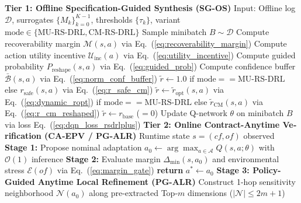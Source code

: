 \documentclass[oneside,openany,phd]{TMU-Thesis}
\begin{document}
\begin{algorithm}[H]
\caption{معماری دوسطحی \rsdrlplus (سنتز غیربرخط سیاست و تصمیم‌گیری مقید به بودجه زمانی)}
\label{alg:rsdrlplus_full}
\begin{latin}
\scriptsize
\begin{algorithmic}[1]
\STATE \textbf{Tier 1: Offline Specification-Guided Synthesis (SG-OS)}
\STATE Input: Offline log $\mathcal{D}$, surrogates $\{M_k\}_{k=0}^{K-1}$, thresholds $\{\tau_k\}$, variant $\text{mode} \in \{\text{MU-RS-DRL}, \text{CM-RS-DRL}\}$
  \STATE Sample minibatch $B \sim \mathcal{D}$
    \STATE Compute recoverability margin $\mathcal{M}(s, a)$ via Eq.~(\ref{eq:recoverability_margin})
    \STATE Compute action utility incentive $\mathcal{U}_{\text{inc}}(a)$ via Eq.~(\ref{eq:utility_incentive})
    \STATE Compute guided probability $P_{\text{reshape}}(s, a)$ via Eq.~(\ref{eq:guided_prob})
      \STATE Compute confidence buffer $\bar{\mathcal{B}}(s, a)$ via Eq.~(\ref{eq:norm_conf_buffer})
    \ENDIF
      \STATE $\tilde{r} \leftarrow 1.0$ if $\text{mode} == \text{MU-RS-DRL}$ else $r_{\text{safe}}(s, a)$ via Eq.~(\ref{eq:r_safe_cm}) 
      \STATE $\tilde{r} \leftarrow \tilde{r}_{\text{opt}}(s, a)$ via Eq.~(\ref{eq:dynamic_ropt}) if $\text{mode} == \text{MU-RS-DRL}$ else $\tilde{r}_{\text{CM}}(s, a)$ via Eq.~(\ref{eq:r_cm_reshaped}) 
    \ELSE
      \STATE $\tilde{r} \leftarrow r_{\text{base}}$ ($= 0$) 
    \ENDIF
  \ENDFOR
  \STATE Update Q-network $\theta$ on minibatch $B$ via loss Eq.~(\ref{eq:dqn_loss_rsdrlplus})
\ENDFOR
\STATE \textbf{Tier 2: Online Contract-Anytime Verification (CA-EPV / PG-ALR)}
\STATE Runtime state $s = (cf, of)$ observed
\STATE \textbf{Stage 1:} Propose nominal adaptation $a_0 \leftarrow \arg\max_{a \in \mathcal{A}} Q(s, a; \theta)$ with $\mathcal{O}(1)$ inference
\STATE \textbf{Stage 2:} Evaluate margin $\Delta_{\min}(s, a_0)$ and environmental stress $\mathcal{E}(of)$ via Eq.~(\ref{eq:margin_gate})
  \STATE \textbf{return} $a^* \leftarrow a_0$ 
\ENDIF
\STATE \textbf{Stage 3: Policy-Guided Anytime Local Refinement (PG-ALR)}
\STATE Construct 1-hop sensitivity neighborhood $\mathcal{N}(a_0)$ along pre-extracted Top-$m$ dimensions ($|\mathcal{N}| \le 2m+1$)

\end{algorithmic}
\end{latin}
\end{algorithm}
\end{document}

